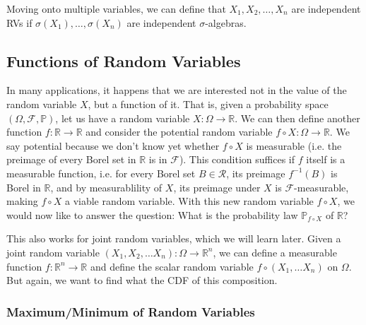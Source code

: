   Moving onto multiple variables, we can define that $X_1, X_2, \ldots, X_n$ are independent RVs if $\sigma(X_1), \ldots, \sigma(X_n)$ are independent $\sigma$-algebras. 

\subsection{Functions of Random Variables}

  In many applications, it happens that we are interested not in the value of the random variable $X$, but a function of it. That is, given a probability space $(\Omega, \mathcal{F}, \mathbb{P})$, let us have a random variable $X: \Omega \rightarrow \mathbb{R}$. We can then define another function $f: \mathbb{R} \rightarrow \mathbb{R}$ and consider the potential random variable $f \circ X : \Omega \rightarrow \mathbb{R}$. We say potential because we don't know yet whether $f \circ X$ is measurable (i.e. the preimage of every Borel set in $\mathbb{R}$ is in $\mathcal{F}$). This condition suffices if $f$ itself is a measurable function, i.e. for every Borel set $B \in \mathcal{R}$, its preimage $f^{-1} (B)$ is Borel in $\mathbb{R}$, and by measurablility of $X$, its preimage under $X$ is $\mathcal{F}$-measurable, making $f \circ X$ a viable random variable. With this new random variable $f \circ X$, we would now like to answer the question: What is the probability law $\mathbb{P}_{f \circ X}$ of $\mathbb{R}$? 

  This also works for joint random variables, which we will learn later. Given a joint random variable $(X_1, X_2, \ldots X_n): \Omega \rightarrow \mathbb{R}^n$, we can define a measurable function $f: \mathbb{R}^n \longrightarrow \mathbb{R}$ and define the scalar random variable $f \circ (X_1, \ldots X_n)$ on $\Omega$. But again, we want to find what the CDF of this composition. 

  \subsubsection{Maximum/Minimum of Random Variables}

